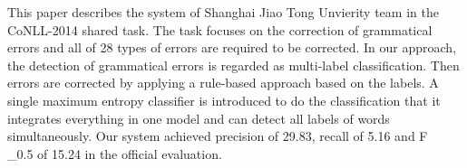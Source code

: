 This paper describes the system of Shanghai Jiao Tong Unvierity team in the CoNLL-2014 shared task. The task focuses on the correction of grammatical errors and all of 28 types of errors are required to be corrected. In our approach, the detection of grammatical errors is regarded as multi-label classification. Then errors are corrected by applying a rule-based approach based on the labels. A single maximum entropy classifier is introduced to do the classification that it integrates everything in one model and can detect all labels of words simultaneously. Our system achieved precision of 29.83, recall of 5.16 and F\\_0.5 of 15.24 in the official evaluation.
